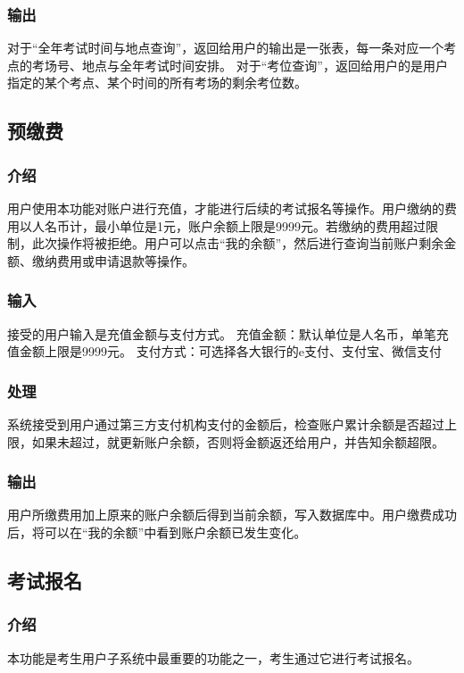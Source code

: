 \subsubsection{输出}
对于“全年考试时间与地点查询”，返回给用户的输出是一张表，每一条对应一个考点的考场号、地点与全年考试时间安排。
对于“考位查询”，返回给用户的是用户指定的某个考点、某个时间的所有考场的剩余考位数。

\subsection{预缴费}

\subsubsection{介绍}
用户使用本功能对账户进行充值，才能进行后续的考试报名等操作。用户缴纳的费用以人名币计，最小单位是1元，账户余额上限是9999元。若缴纳的费用超过限制，此次操作将被拒绝。用户可以点击“我的余额”，然后进行查询当前账户剩余金额、缴纳费用或申请退款等操作。

\subsubsection{输入}
接受的用户输入是充值金额与支付方式。
充值金额：默认单位是人名币，单笔充值金额上限是9999元。
支付方式：可选择各大银行的e支付、支付宝、微信支付

\subsubsection{处理}
系统接受到用户通过第三方支付机构支付的金额后，检查账户累计余额是否超过上限，如果未超过，就更新账户余额，否则将金额返还给用户，并告知余额超限。

\subsubsection{输出}
用户所缴费用加上原来的账户余额后得到当前余额，写入数据库中。用户缴费成功后，将可以在“我的余额”中看到账户余额已发生变化。

\subsection{考试报名}

\subsubsection{介绍}
本功能是考生用户子系统中最重要的功能之一，考生通过它进行考试报名。

